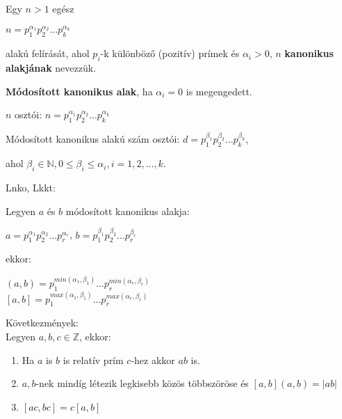 \begin{frame}
  \begin{tcolorbox}[title={Def.: Kanonikus alak, Módosított kanonikus alak}]
    Egy $n > 1$ egész\\
    \mmedskip

    $n = p_1^{{\alpha_1}}p_2^{{\alpha_2}}...p_k^{{\alpha_k}}$\\
    \mmedskip

    alakú felírását, ahol $p_i$-k különböző (pozitív) prímek és ${\alpha}_i > 0$, $n$ \textbf{kanonikus alakjának} nevezzük.\\
    \mmedskip

    \textbf{Módosított kanonikus alak}, ha ${\alpha}_i = 0$ is megengedett.
  \end{tcolorbox}

  \begin{tcolorbox}[title={Ész}]
    $n$ osztói: $n = p_1^{{\alpha_1}}p_2^{{\alpha_2}}...p_k^{{\alpha_k}}$\\
    \mmedskip

    Módosított kanonikus alakú szám osztói: $d = p_1^{{\beta}_1}p_2^{{\beta}_2}...p_k^{{\beta}_k}$,\\
    \msmallskip
    
    ahol ${\beta}_i \in \mathbb{N}, 0 \leq {\beta}_i \leq {\alpha}_i, i = 1, 2, ..., k$.\\
    \mmedskip

    Lnko, Lkkt:\\
    \mmedskip

    Legyen $a$ és $b$ módosított kanonikus alakja:\\
    \msmallskip
    
    $a = p_1^{{\alpha}_1}p_2^{{\alpha}_2}...p_r^{{\alpha}_r}$, $b = p_1^{{\beta}_1}p_2^{{\beta}_2}...p_r^{{\beta}_r}$\\
    \mmedskip

    ekkor:\\
    \msmallskip
    
    $(a, b) = p_1^{min({\alpha}_1, {\beta}_1)}...p_r^{min({\alpha}_r, {\beta}_r)}$\\
    $[a, b] = p_1^{max({\alpha}_1, {\beta}_1)}...p_r^{max({\alpha}_r, {\beta}_r)}$\\
    \mbigskip

    Következmények:\\
    Legyen $a, b, c \in \mathbb{Z}$, ekkor:\\
    \begin{enumerate}
      \item Ha $a$ is $b$ is relatív prím $c$-hez akkor $ab$ is.
      \item $a, b$-nek mindíg létezik legkisebb közös többszöröse és $[a, b](a, b) = |ab|$
      \item $[ac, bc] = c[a, b]$
    \end{enumerate}
  \end{tcolorbox}
\end{frame}

